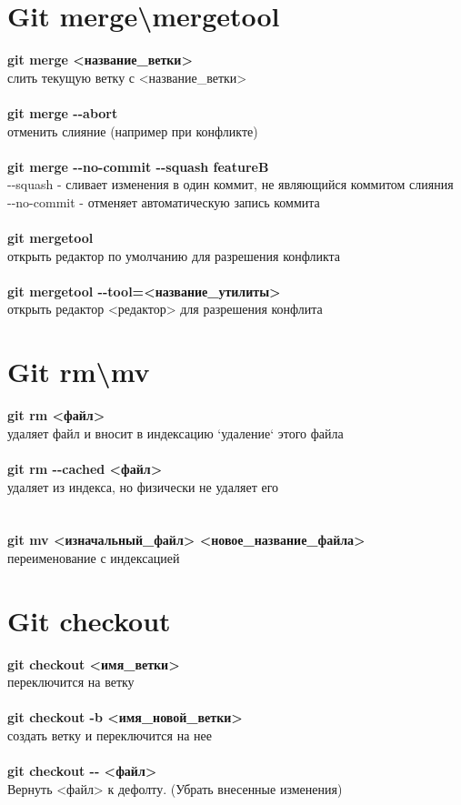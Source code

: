 \documentclass[a4paper, 12px]{report}
\begin{document}
\section{Git merge\textbackslash mergetool}

\textbf{git merge <название\_ветки>}\\слить текущую ветку с <название\_ветки>\\\\
\textbf{git merge -\--abort}\\отменить слияние (например при конфликте)\\\\
\textbf{git merge -\--no-commit -\--squash featureB}\\-\--squash - сливает изменения в один коммит, не являющийся коммитом слияния\\
-\--no-commit - отменяет автоматическую запись коммита\\\\
\textbf{git mergetool}\\открыть редактор по умолчанию для разрешения конфликта\\\\
\textbf{git mergetool -\--tool=<название\_утилиты>}\\открыть редактор <редактор> для разрешения конфлита

\section{Git rm\textbackslash mv}

\textbf{git rm <файл>}\\удаляет файл и вносит в индексацию `удаление` этого файла\\\\
\textbf{git rm -\--cached <файл>}\\удаляет из индекса, но физически не удаляет его\\\\\\
\textbf{git mv <изначальный\_файл> <новое\_название\_файла>}\\
переименование с индексацией

\section{Git checkout}

\textbf{git checkout <имя\_ветки>}\\переключится на ветку\\\\
\textbf{git checkout -b <имя\_новой\_ветки>}\\создать ветку и переключится на нее\\\\
\textbf{git checkout -\-- <файл>}\\Вернуть <файл> к дефолту. (Убрать внесенные изменения)
\end{document}

